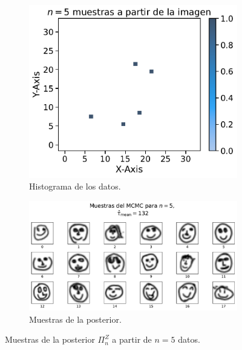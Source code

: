 \begin{figure}[H]
    \centering
    \begin{subfigure}[t]{0.35\textwidth}
        \centering
        \includegraphics[width=\textwidth]{img/mcmc/samples-hist-n-005.pdf}
        \caption{Histograma de los datos.}
        \label{fig:samples-hist-n-005}
    \end{subfigure}
    \hfill
    \begin{subfigure}[t]{0.59\textwidth}
        \centering
        \includegraphics[width=\textwidth]{img/mcmc/mcmc-n-005-NUTSPosteriorSampler.pdf}
        \caption{Muestras de la posterior.}
        \label{fig:mcmc-n-005-NUTSPosteriorSampler}
    \end{subfigure}
    \caption{Muestras de la posterior $\Pi^Z_n$ a partir de $n=5$ datos.}
    \label{fig:mcmc-n-005}
\end{figure}

